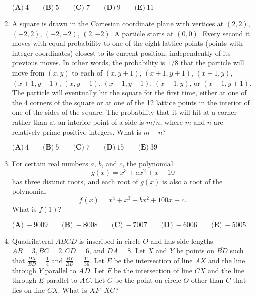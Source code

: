 \documentclass{article}
\begin{document}
\begin{enumerate}[label=\arabic*., itemsep=0.5em]
$\textbf{(A)}\ 4 \qquad \textbf{(B)}\ 5 \qquad\textbf{(C)}\ 7 \qquad\textbf{(D)}\ 9 \qquad\textbf{(E)}\ 11$\par \vspace{0.5em}\item A square is drawn in the Cartesian coordinate plane with vertices at $(2, 2)$, $(-2, 2)$, $(-2, -2)$, $(2, -2)$. A particle starts at $(0,0)$. Every second it moves with equal probability to one of the eight lattice points (points with integer coordinates) closest to its current position, independently of its previous moves. In other words, the probability is $1/8$ that the particle will move from $(x, y)$ to each of $(x, y + 1)$, $(x + 1, y + 1)$, $(x + 1, y)$, $(x + 1, y - 1)$, $(x, y - 1)$, $(x - 1, y - 1)$, $(x - 1, y)$, or $(x - 1, y + 1)$. The particle will eventually hit the square for the first time, either at one of the 4 corners of the square or at one of the 12 lattice points in the interior of one of the sides of the square. The probability that it will hit at a corner rather than at an interior point of a side is $m/n$, where $m$ and $n$ are relatively prime positive integers. What is $m + n$?

$\textbf{(A)}\ 4 \qquad \textbf{(B)}\ 5 \qquad\textbf{(C)}\ 7 \qquad\textbf{(D)}\ 15 \qquad\textbf{(E)}\ 39$\par \vspace{0.5em}\item For certain real numbers $a$, $b$, and $c$, the polynomial 
\begin{equation*}
g(x) = x^3 + ax^2 + x + 10
\end{equation*}
has three distinct roots, and each root of $g(x)$ is also a root of the polynomial 
\begin{equation*}
f(x) = x^4 + x^3 + bx^2 + 100x + c.
\end{equation*}
What is $f(1)$?

$\textbf{(A)}\ -9009 \qquad\textbf{(B)}\ -8008 \qquad\textbf{(C)}\ -7007 \qquad\textbf{(D)}\ -6006 \qquad\textbf{(E)}\ -5005$\par \vspace{0.5em}\item Quadrilateral $ABCD$ is inscribed in circle $O$ and has side lengths $AB=3, BC=2, CD=6$, and $DA=8$. Let $X$ and $Y$ be points on $\overline{BD}$ such that $\frac{DX}{BD} = \frac{1}{4}$ and $\frac{BY}{BD} = \frac{11}{36}$. Let $E$ be the intersection of line $AX$ and the line through $Y$ parallel to $\overline{AD}$. Let $F$ be the intersection of line $CX$ and the line through $E$ parallel to $\overline{AC}$. Let $G$ be the point on circle $O$ other than $C$ that lies on line $CX$. What is $XF\cdot XG$?


\end{enumerate}
\end{document}
